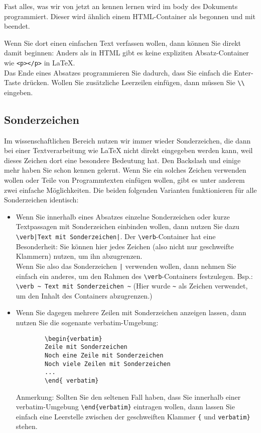 Fast alles, was wir von jetzt an kennen lernen wird im body des Dokuments programmiert. Dieser wird ähnlich einem HTML-Container als \verb|| begonnen und mit \verb|| beendet.

Wenn Sie dort einen einfachen Text verfassen wollen, dann können Sie direkt damit beginnen: Anders als in HTML gibt es keine expliziten Absatz-Container wie \verb|<p></p>| in LaTeX.\\

Das Ende eines Absatzes \glqq{}programmieren\grqq{} Sie dadurch, dass Sie einfach die Enter-Taste drücken. Wollen Sie zusätzliche Leerzeilen einfügen, dann müssen Sie \verb|\\| eingeben.

\subsection{Sonderzeichen}

Im wissenschaftlichen Bereich nutzen wir immer wieder Sonderzeichen, die dann bei einer Textverarbeitung wie LaTeX nicht direkt eingegeben werden kann, weil dieses Zeichen dort eine besondere Bedeutung hat. Den Backslash und einige mehr haben Sie schon kennen gelernt. Wenn Sie ein solches Zeichen verwenden wollen oder Teile von Programmtexten einfügen wollen, gibt es unter anderem zwei einfache Möglichkeiten. Die beiden folgenden Varianten funktionieren für alle Sonderzeichen identisch:\\

\begin{itemize}
	\item Wenn Sie innerhalb eines Absatzes einzelne Sonderzeichen oder kurze Textpassagen mit Sonderzeichen einbinden wollen, dann nutzen Sie dazu \verb~\verb|Text mit Sonderzeichen|~. Der \verb|\verb|-Container hat eine Besonderheit: Sie können hier jedes Zeichen (also nicht nur geschweifte Klammern) nutzen, um ihn abzugrenzen.\\
	
	Wenn Sie also das Sonderzeichen \verb+|+ verwenden wollen, dann nehmen Sie einfach ein anderes, um den Rahmen des \verb|\verb|-Containers festzulegen. Bsp.: \verb|\verb ~ Text mit Sonderzeichen ~| (Hier wurde \verb|~| als Zeichen verwendet, um den Inhalt des Containers abzugrenzen.)
	
	\item Wenn Sie dagegen mehrere Zeilen mit Sonderzeichen anzeigen lassen, dann nutzen Sie die sogenante verbatim-Umgebung:
	
	\begin{verbatim}
		\begin{verbatim}
		Zeile mit Sonderzeichen
		Noch eine Zeile mit Sonderzeichen
		Noch viele Zeilen mit Sonderzeichen
		...
		\end{ verbatim}
	\end{verbatim}
	
	Anmerkung: Sollten Sie den seltenen Fall haben, dass Sie innerhalb einer verbatim-Umgebung \verb|\end{verbatim}| eintragen wollen, dann lassen Sie einfach eine Leerstelle zwischen der geschweiften Klammer \verb|{| und \verb|verbatim}| stehen.
\end{itemize}

